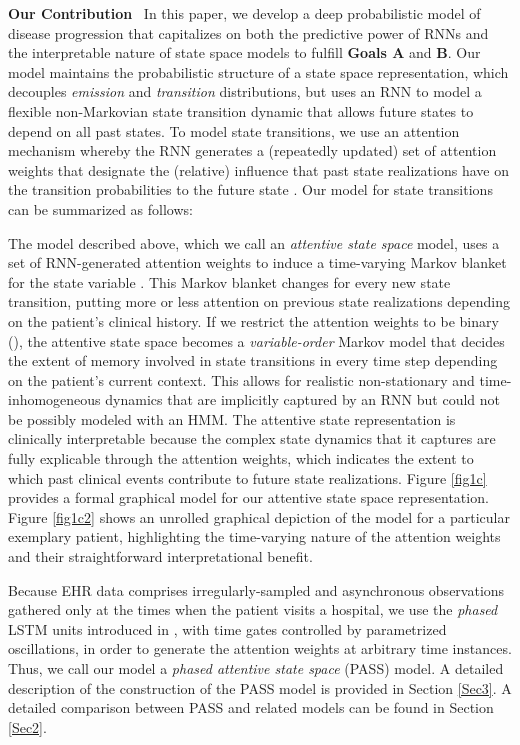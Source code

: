 \documentclass[twoside,11pt]{article}
\begin{document}
{\bf Our Contribution}\,\,\, In this paper, we develop a deep probabilistic model of disease progression that capitalizes on both the predictive power of RNNs and the interpretable nature of state space models to fulfill {\bf Goals A} and {\bf B}. Our model maintains the probabilistic structure of a state space representation, which decouples {\it emission} and {\it transition} distributions, but uses an RNN to model a flexible non-Markovian state transition dynamic \mbox{\footnotesize } that allows future states to depend on all past states. To model state transitions, we use an attention mechanism whereby the RNN generates a (repeatedly updated) set of attention weights \mbox{\footnotesize } that designate the (relative) influence that past state realizations \mbox{\footnotesize } have on the transition probabilities to the future state \mbox{\footnotesize }. Our model for state transitions can be summarized as follows:

The model described above, which we call an {\it attentive state space} model, uses a set of RNN-generated attention weights to induce a time-varying Markov blanket for the state variable \mbox{\footnotesize }. This Markov blanket changes for every new state transition, putting more or less attention on previous state realizations depending on the patient's clinical history. If we restrict the attention weights to be binary (), the attentive state space becomes a {\it variable-order} Markov model that decides the extent of memory involved in state transitions in every time step depending on the patient's current context. This allows for realistic non-stationary and time-inhomogeneous dynamics that are implicitly captured by an RNN but could not be possibly modeled with an HMM. The attentive state representation is clinically interpretable because the complex state dynamics that it captures are fully explicable through the attention weights, which indicates the extent to which past clinical events contribute to future state realizations. Figure \ref{fig1c} provides a formal graphical model for our attentive state space representation. Figure \ref{fig1c2} shows an unrolled graphical depiction of the model for a particular exemplary patient, highlighting the time-varying nature of the attention weights and their straightforward interpretational benefit.   

Because EHR data comprises irregularly-sampled and asynchronous observations gathered only at the times when the patient visits a hospital, we use the {\it phased} LSTM units introduced in \cite{neil2016phased}, with time gates controlled by parametrized oscillations, in order to generate the attention weights at arbitrary time instances. Thus, we call our model a {\it phased attentive state space} (PASS) model. A detailed description of the construction of the PASS model is provided in Section \ref{Sec3}. A detailed comparison between PASS and related models can be found in Section \ref{Sec2}. 
\end{document}
